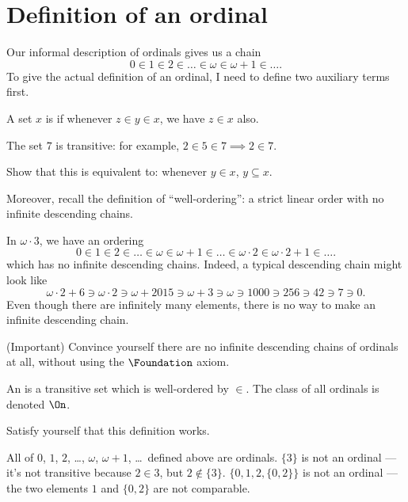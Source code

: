 \section{Definition of an ordinal}
Our informal description of ordinals gives us a chain
\[ 0 \in 1 \in 2 \in \dots \in \omega \in \omega+1 \in \dots. \]
To give the actual definition of an ordinal, I need to define two auxiliary terms first.
\begin{definition}
	A set $x$ is  if whenever $z \in y \in x$, we have $z \in x$ also.
\end{definition}
\begin{example}
	[$7$ is transitive]
	The set $7$ is transitive: for example, $2 \in 5 \in 7 \implies 2 \in 7$.
\end{example}
\begin{ques}
	Show that this is equivalent to: whenever $y \in x$, $y \subseteq x$.
\end{ques}
Moreover, recall the definition of ``well-ordering'': a strict linear order
with no infinite descending chains.
\begin{example}
	In $\omega \cdot 3$, we have an ordering
	\[ 0 \in 1 \in 2 \in \dots \in \omega \in \omega+1 \in \dots
		\in \omega \cdot 2 \in \omega \cdot 2 + 1 \in \dots. \]
	which has no infinite descending chains.
	Indeed, a typical descending chain might look like
	\[ \omega \cdot 2 + 6 \ni \omega \cdot 2 \ni
		\omega + 2015 \ni \omega+3 \ni \omega \ni 1000 \ni 256 \ni 42 \ni 7 \ni 0. \]
	Even though there are infinitely many elements, there is no way
	to make an infinite descending chain.
\end{example}
\begin{exercise}
	(Important)
	Convince yourself there are no infinite
	descending chains of ordinals at all,
	without using the $\Foundation$ axiom.
\end{exercise}

\begin{definition}
	An  is a transitive set which is well-ordered by $\in$.
	The class of all ordinals is denoted $\On$.
\end{definition}

\begin{ques}
	Satisfy yourself that this definition works.
\end{ques}

\begin{example}
	\listhack
	\begin{itemize}
		\ii All of $0$, $1$, $2$, \dots, $\omega$, $\omega+1$, \dots\ defined above are ordinals.
		\ii $\{ 3 \}$ is not an ordinal --- it's not transitive because $2 \in 3$,
		but $2 \notin \{ 3 \}$.
		\ii $\{ 0, 1, 2, \{ 0, 2 \} \}$ is not an ordinal --- the two elements $1$ and $\{ 0, 2
		\}$ are not comparable.
	\end{itemize}
\end{example}

